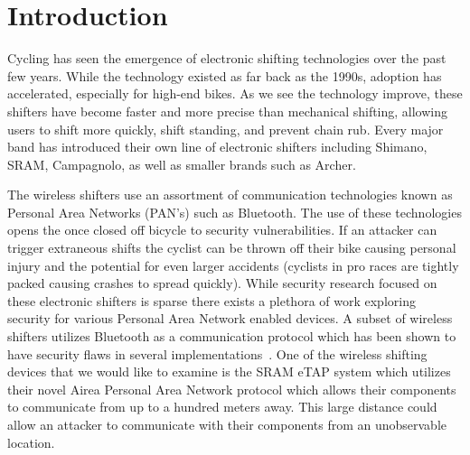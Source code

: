 \documentclass[letterpaper,twocolumn,10pt]{article}
\begin{document}

\section{Introduction}



Cycling has seen the emergence of electronic shifting technologies over the past few years. While the technology existed as far back as the 1990s, adoption has accelerated, especially for high-end bikes. As we see the technology improve, these shifters have become faster and more precise than mechanical shifting, allowing users to shift more quickly, shift standing, and prevent chain rub. Every major band has introduced their own line of electronic shifters including Shimano, SRAM, Campagnolo, as well as smaller brands such as Archer.

The wireless shifters use an assortment of communication technologies known as Personal Area Networks (PAN’s) such as Bluetooth. The use of these technologies opens the once closed off bicycle to security vulnerabilities. If an attacker can trigger extraneous shifts the cyclist can be thrown off their bike causing personal injury and the potential for even larger accidents (cyclists in pro races are tightly packed causing crashes to spread quickly). While security research focused on these electronic shifters is sparse there exists a plethora of work exploring security for various Personal Area Network enabled devices. A subset of wireless shifters utilizes Bluetooth as a communication protocol which has been shown to have security flaws in several implementations~\cite{JiWu}. One of the wireless shifting devices that we would like to examine is the SRAM eTAP system which utilizes their novel Airea Personal Area Network protocol which allows their components to communicate from up to a hundred meters away. This large distance could allow an attacker to communicate with their components from an unobservable location.
\end{document}
